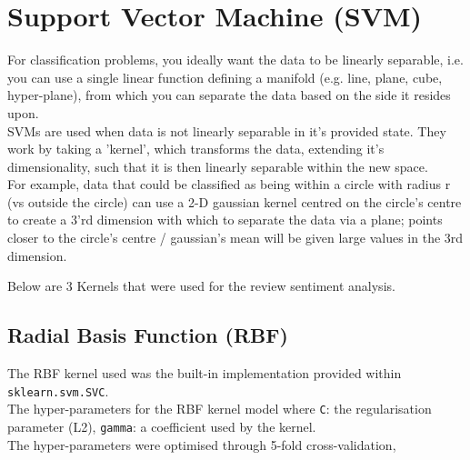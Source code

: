 \section{Support Vector Machine (SVM)}

For classification problems, you ideally want the data to be linearly separable, i.e. you can use a single linear function defining a manifold (e.g. line, plane, cube, hyper-plane), from which you can separate the data based on the side it resides upon.\\
SVMs are used when data is not linearly separable in it's provided state. They work by taking a 'kernel', which transforms the data, extending it's dimensionality, such that it is then linearly separable within the new space.\\
For example, data that could be classified as being within a circle with radius r (vs outside the circle) can use a 2-D gaussian kernel centred on the circle's centre to create a 3'rd dimension with which to separate the data via a plane; points closer to the circle's centre / gaussian's mean will be given large values in the 3rd dimension.

Below are 3 Kernels that were used for the review sentiment analysis.

\subsection{Radial Basis Function (RBF)}





The RBF kernel used was the built-in implementation provided within \verb|sklearn.svm.SVC|.\\
The hyper-parameters for the RBF kernel model where \verb|C|: the regularisation parameter (L2), \verb|gamma|: a coefficient used by the kernel.\\
The hyper-parameters were optimised through 5-fold cross-validation, 

